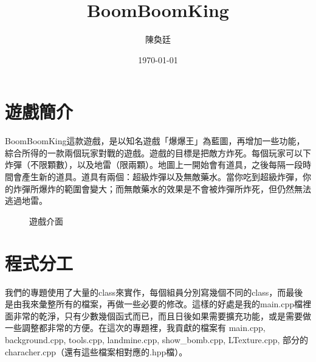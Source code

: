 \documentclass[a4paper]{article}
\title{BoomBoomKing} %
\author{陳奐廷} %
\date{\today} %
\theoremstyle{mystyle}	%
\begin{document}
\maketitle %
\thispagestyle{fancy}  %
\setcounter{section}{-1} %
\section{遊戲簡介}
BoomBoomKing這款遊戲，是以知名遊戲「爆爆王」為藍圖，再增加一些功能，綜合所得的一款兩個玩家對戰的遊戲。遊戲的目標是把敵方炸死。每個玩家可以下炸彈（不限顆數），以及地雷（限兩顆）。地圖上一開始會有道具，之後每隔一段時間會產生新的道具。道具有兩個：超級炸彈以及無敵藥水。當你吃到超級炸彈，你的炸彈所爆炸的範圍會變大；而無敵藥水的效果是不會被炸彈所炸死，但仍然無法逃過地雷。
\begin{figure}[ht]
\begin{center}
\graphicspath{{project_image/}}
\hspace{2em}
\caption{遊戲介面}
\end{center}
\end{figure}
\section{程式分工}
我們的專題使用了大量的class來實作，每個組員分別寫幾個不同的class，而最後是由我來彙整所有的檔案，再做一些必要的修改。這樣的好處是我的main.cpp檔裡面非常的乾淨，只有少數幾個函式而已，而且日後如果需要擴充功能，或是需要做一些調整都非常的方便。在這次的專題裡，我貢獻的檔案有 main.cpp, background.cpp, tools.cpp, landmine.cpp, show\_bomb.cpp, LTexture.cpp, 部分的characher.cpp（還有這些檔案相對應的.hpp檔）。
\end{document}
